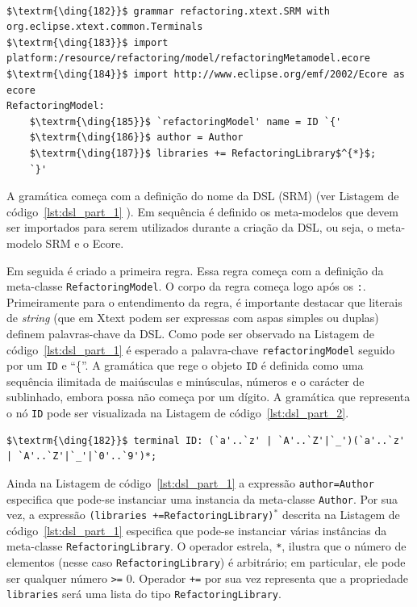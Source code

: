 \begin{lstlisting}[language=Xtext, frame=single, basicstyle={\scriptsize}, mathescape=true, label={lst:dsl_part_1}, caption={Gramática da DSL - parte 1}]
	
$\textrm{\ding{182}}$ grammar refactoring.xtext.SRM with org.eclipse.xtext.common.Terminals 
$\textrm{\ding{183}}$ import platform:/resource/refactoring/model/refactoringMetamodel.ecore
$\textrm{\ding{184}}$ import http://www.eclipse.org/emf/2002/Ecore as ecore
RefactoringModel: 
	$\textrm{\ding{185}}$ `refactoringModel' name = ID `{'
	$\textrm{\ding{186}}$ author = Author
	$\textrm{\ding{187}}$ libraries += RefactoringLibrary$^{*}$;
	`}'
\end{lstlisting}

A gramática começa com a definição do nome da DSL (SRM) (ver Listagem de código~\ref{lst:dsl_part_1} ). Em sequência é definido os meta-modelos que devem ser importados para serem utilizados durante a criação da DSL, ou seja, o meta-modelo SRM  e o Ecore.

Em seguida é criado a primeira regra. Essa regra começa com a definição da meta-classe \texttt{RefactoringModel}. O corpo da regra começa logo após os \texttt{:}. Primeiramente para o entendimento da regra, é importante destacar que literais de \textit{string} (que em Xtext podem ser expressas com aspas simples ou duplas) definem palavras-chave da DSL. Como pode ser observado na Listagem de código~\ref{lst:dsl_part_1} é esperado a palavra-chave \texttt{refactoringModel} seguido por um \texttt{ID} e ``\{''. A gramática que rege o objeto \texttt{ID} é definida como uma sequência ilimitada de maiúsculas e minúsculas, números e o carácter de sublinhado, embora possa não começa por um dígito. A gramática que representa o nó \texttt{ID} pode ser visualizada na Listagem de código~\ref{lst:dsl_part_2}. 

\begin{lstlisting}[language=Xtext, frame=single, basicstyle=\scriptsize, mathescape=true, label={lst:dsl_part_2}, caption={Gramática da DSL - parte 2}]
	$\textrm{\ding{182}}$ terminal ID: (`a'..`z' | `A'..`Z'|`_')(`a'..`z' | `A'..`Z'|`_'|`0'..`9')*;
\end{lstlisting}

Ainda na Listagem de código~\ref{lst:dsl_part_1}  a expressão \texttt{author=Author} especifica que pode-se instanciar uma instancia da meta-classe \texttt{Author}. Por sua vez, a expressão \texttt{(libraries +=RefactoringLibrary)$^{*}$} descrita na Listagem de código~\ref{lst:dsl_part_1} especifica que pode-se instanciar várias instâncias da meta-classe \texttt{RefactoringLibrary}. O operador estrela, \texttt{*}, ilustra que o número de elementos (nesse caso \texttt{RefactoringLibrary}) é arbitrário; em particular, ele pode ser qualquer número \texttt{>=} 0. Operador \texttt{+=} por sua vez representa que a propriedade \texttt{libraries} será uma lista do tipo \texttt{RefactoringLibrary}.

